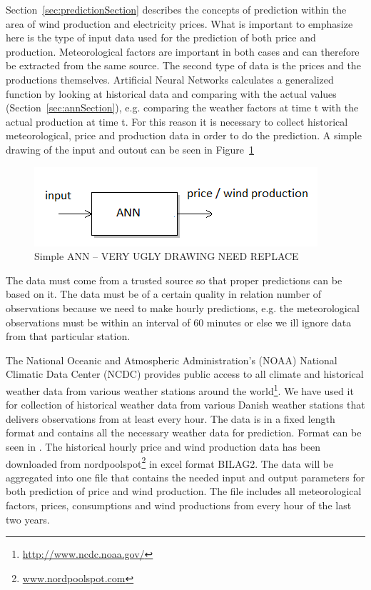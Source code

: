 Section~\ref{sec:predictionSection} describes the concepts of prediction within the area of wind production and electricity prices. What is important to emphasize here is the type of input data used for the prediction of both price and production. Meteorological factors are important in both cases and can therefore be extracted from the same source. The second type of data is the prices and the productions themselves. Artificial Neural Networks calculates a generalized function by looking at historical data and comparing with the actual values (Section~\ref{sec:annSection}), e.g. comparing the weather factors at time t with the actual production at time t. For this reason it is necessary to collect historical meteorological, price and production data in order to do the prediction. A simple drawing of the input and outout can be seen in Figure~\ref{fig:verySimpleANN}

\begin{figure}[H]
\centering
\includegraphics[width=0.85\linewidth,natwidth=898,natheight=587]{billeder/simpleANN.png}
\caption{Simple ANN -- VERY UGLY DRAWING NEED REPLACE}
\label{fig:verySimpleANN}
\end{figure}

The data must come from a trusted source so that proper predictions can be based on it. The data must be of a certain quality in relation number of observations because we need to make hourly predictions, e.g. the meteorological observations must be within an interval of 60 minutes or else we ill ignore data from that particular station.

The National Oceanic and Atmospheric Administration's (NOAA) National Climatic Data Center (NCDC) provides public access to all climate and historical weather data from various weather stations around the world\footnote{\url{http://www.ncdc.noaa.gov/}}. We have used it for collection of historical weather data from various Danish weather stations that delivers observations from at least every hour. The data is in a fixed length format and contains all the necessary weather data for prediction. Format can be seen in . 
The historical hourly price and wind production data has been downloaded from nordpoolspot\footnote{\url{www.nordpoolspot.com}} in excel format BILAG2.
The data will be aggregated into one file that contains the needed input and output parameters for both prediction of price and wind production. The file includes all meteorological factors, prices, consumptions and wind productions from every hour of the last two years. 

